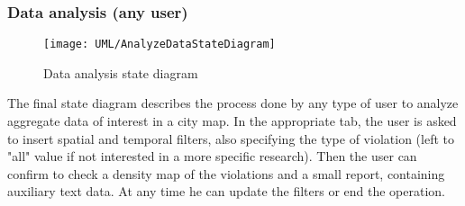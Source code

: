 \subsubsection{Data analysis (any user)}

\begin{figure}[H]
	\centering
	\texttt{[image: UML/AnalyzeDataStateDiagram]}
	\caption{Data analysis state diagram}
\end{figure}

The final state diagram describes the process done by any type of user to analyze aggregate data of interest in a city map. In the appropriate tab, the user is asked to insert spatial and temporal filters, also specifying the type of violation (left to "all" value if not interested in a more specific research). Then the user can confirm to check a density map of the violations and a small report, containing auxiliary text data. At any time he can update the filters or end the operation.